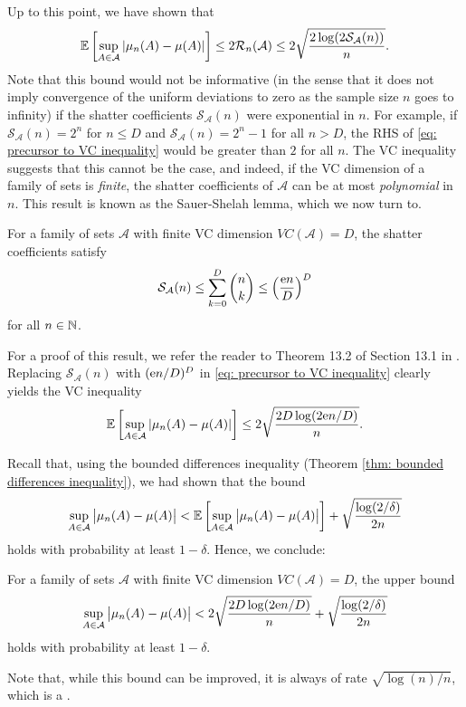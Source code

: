 Up to this point, we have shown that
\begin{equation}
\label{eq: precursor to VC inequality}
    \mathbb{E}\left[ \sup_{A \in \mathcal{A}} \abs{\mu_n(A) - \mu(A)} \right] \leq 2 \mathcal{R}_n(\mathcal{A}) \leq 2 \sqrt{ \frac{2 \log(2 \mathcal{S}_{\mathcal{A}}(n)) }{n} }.
\end{equation}
Note that this bound would not be informative (in the sense that it does not imply convergence of the uniform deviations to zero as the sample size $n$ goes to infinity) if the shatter coefficients $\mathcal{S}_{\mathcal{A}}(n)$ were exponential in $n$. For example, if $\mathcal{S}_{\mathcal{A}}(n) = 2^n$ for $n \leq D$ and $\mathcal{S}_{\mathcal{A}}(n) = 2^n - 1$ for all $n > D$, the RHS of \eqref{eq: precursor to VC inequality} would be greater than $2$ for all $n$. The VC inequality suggests that this cannot be the case, and indeed, if the VC dimension of a family of sets is \emph{finite}, the shatter coefficients of $\mathcal{A}$ can be at most \emph{polynomial} in $n$. This result is known as the Sauer-Shelah lemma, which we now turn to.

\begin{lemma}
For a family of sets $\mathcal{A}$ with finite VC dimension $VC(\mathcal{A}) = D$, the shatter coefficients satisfy
\[
    \mathcal{S}_{\mathcal{A}}(n) \leq \sum_{k=0}^D \binom{n}{k} \leq \left( \frac{\mathrm{e} n}{D} \right)^D
\]
for all $n \in \mathbb{N}$.
\end{lemma}

For a proof of this result, we refer the reader to Theorem 13.2 of Section 13.1 in \cite[p.~216]{devroye1996probabilistic}. Replacing $\mathcal{S}_{\mathcal{A}}(n)$ with $(\mathrm{e} n/D)^D$ in \eqref{eq: precursor to VC inequality} clearly yields the VC inequality
\[
    \mathbb{E}\left[ \sup_{A \in \mathcal{A}} \abs{\mu_n(A) - \mu(A)} \right] \leq 2 \sqrt{\frac{2D \log(2 \mathrm{e} n / D)}{n}}.
\]

Recall that, using the bounded differences inequality (Theorem \ref{thm: bounded differences inequality}), we had shown that the bound
\[
    \sup_{A \in \mathcal{A}} \big\lvert \mu_n(A) - \mu(A) \big\rvert < \mathbb{E}\left[\sup_{A \in \mathcal{A}} \big\lvert \mu_n(A) - \mu(A) \big\rvert\right] + \sqrt{\frac{\log(2 / \delta)}{2n}}
\]
holds with probability at least $1 - \delta$. Hence, we conclude:

\begin{corollary}[VC Inequality]
For a family of sets $\mathcal{A}$ with finite VC dimension $VC(\mathcal{A}) = D$, the upper bound
\[
    \sup_{A \in \mathcal{A}} \big\lvert \mu_n(A) - \mu(A) \big\rvert < 2 \sqrt{\frac{2D \log(2 \mathrm{e} n / D)}{n}} + \sqrt{\frac{\log(2 / \delta)}{2n}}
\]
holds with probability at least $1 - \delta$.
\end{corollary}

Note that, while this bound can be improved, it is always of rate $\sqrt{\log(n) / n}$, which is a .
